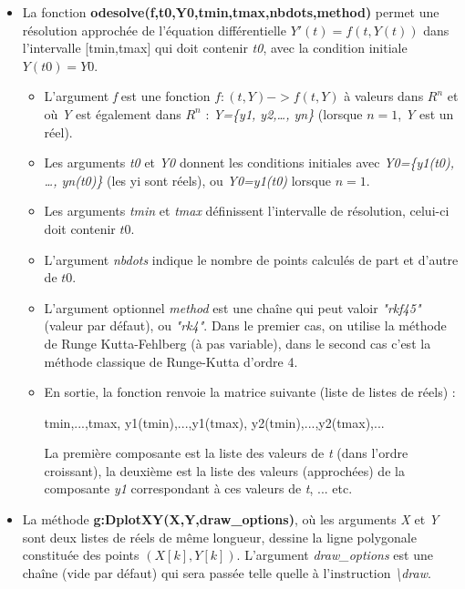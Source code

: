 \documentclass[%
10pt,%
a4paper,%
french,%
]%
{article}%
\begin{document}
\begin{itemize}
\item La fonction \textbf{odesolve(f,t0,Y0,tmin,tmax,nbdots,method)} permet une résolution approchée de l'équation différentielle \(Y'(t)=f(t,Y(t))\) dans l'intervalle {[}tmin,tmax{]} qui doit contenir \emph{t0}, avec la condition initiale $Y(t0)=Y0$.

\begin{itemize}
  \item L'argument \emph{f} est une fonction \(f: (t,Y) -> f(t,Y)\) à valeurs dans \(R^n\) et où \emph{Y} est également dans \(R^n\) : \emph{Y=\{y1, y2,\ldots, yn\}} (lorsque $n=1$, \emph{Y} est un réel).
  \item Les arguments \emph{t0} et \emph{Y0} donnent les conditions initiales avec \emph{Y0=\{y1(t0), \ldots, yn(t0)\}} (les yi sont réels), ou \emph{Y0=y1(t0)} lorsque $n=1$.
  \item Les arguments \emph{tmin} et \emph{tmax} définissent l'intervalle de résolution, celui-ci doit contenir \(t0\).
  \item L'argument \emph{nbdots} indique le nombre de points calculés de part et d'autre de \(t0\).
  \item L'argument optionnel \emph{method} est une chaîne qui peut valoir \emph{"rkf45"} (valeur par défaut), ou \emph{"rk4"}. Dans le premier cas, on utilise la méthode de Runge Kutta-Fehlberg (à pas variable), dans le second cas c'est la méthode classique de Runge-Kutta d'ordre 4.
  \item En sortie, la fonction renvoie la matrice suivante (liste de listes de réels) :

\begin{TeXcode}
{ {tmin,...,tmax}, {y1(tmin),...,y1(tmax)}, {y2(tmin),...,y2(tmax)},...}
\end{TeXcode}

  La première composante est la liste des valeurs de \emph{t} (dans l'ordre croissant), la deuxième est la liste des valeurs (approchées) de la composante \emph{y1} correspondant à ces valeurs de \emph{t}, ... etc.
    \end{itemize}
    
\item La méthode \textbf{g:DplotXY(X,Y,draw\_options)}, où les arguments \emph{X} et \emph{Y} sont deux listes de réels de même longueur, dessine la ligne polygonale constituée des points $(X[k],Y[k])$. L'argument \emph{draw\_options} est une chaîne (vide par défaut) qui sera passée telle quelle à l'instruction \emph{\textbackslash draw}.


\end{itemize}
\end{document}
